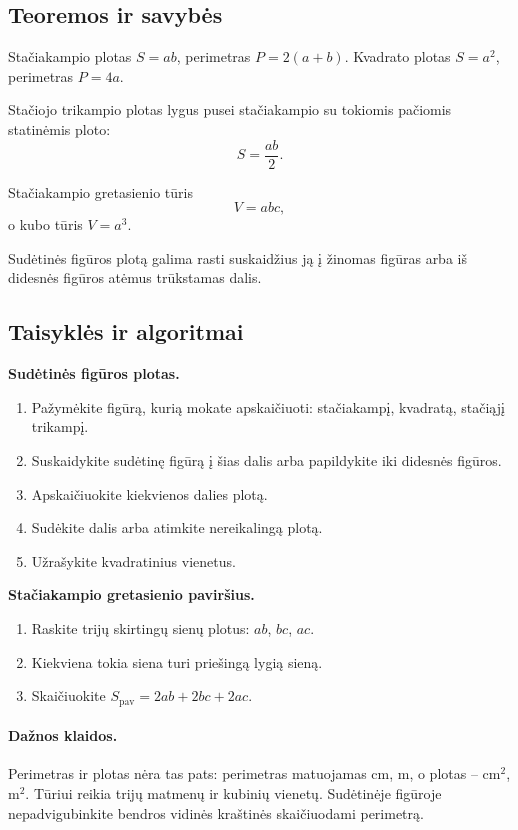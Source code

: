 \subsection{Teoremos ir savybės}
\begin{savybe}
Stačiakampio plotas \(S=ab\), perimetras \(P=2(a+b)\). Kvadrato plotas \(S=a^2\), perimetras \(P=4a\).
\end{savybe}
\begin{savybe}
Stačiojo trikampio plotas lygus pusei stačiakampio su tokiomis pačiomis statinėmis ploto:
\[
S=\frac{ab}{2}.
\]
\end{savybe}
\begin{savybe}
Stačiakampio gretasienio tūris
\[
V=abc,
\]
o kubo tūris \(V=a^3\).
\end{savybe}
\begin{savybe}
Sudėtinės figūros plotą galima rasti suskaidžius ją į žinomas figūras arba iš didesnės figūros atėmus trūkstamas dalis.
\end{savybe}

\subsection{Taisyklės ir algoritmai}
\textbf{Sudėtinės figūros plotas.}
\begin{enumerate}[label=\arabic*.]
\item Pažymėkite figūrą, kurią mokate apskaičiuoti: stačiakampį, kvadratą, stačiąjį trikampį.
\item Suskaidykite sudėtinę figūrą į šias dalis arba papildykite iki didesnės figūros.
\item Apskaičiuokite kiekvienos dalies plotą.
\item Sudėkite dalis arba atimkite nereikalingą plotą.
\item Užrašykite kvadratinius vienetus.
\end{enumerate}

\textbf{Stačiakampio gretasienio paviršius.}
\begin{enumerate}[label=\arabic*.]
\item Raskite trijų skirtingų sienų plotus: \(ab\), \(bc\), \(ac\).
\item Kiekviena tokia siena turi priešingą lygią sieną.
\item Skaičiuokite \(S_{\text{pav}}=2ab+2bc+2ac\).
\end{enumerate}

\paragraph{Dažnos klaidos.}
Perimetras ir plotas nėra tas pats: perimetras matuojamas cm, m, o plotas -- \(\text{cm}^2\), \(\text{m}^2\). Tūriui reikia trijų matmenų ir kubinių vienetų. Sudėtinėje figūroje nepadvigubinkite bendros vidinės kraštinės skaičiuodami perimetrą.


